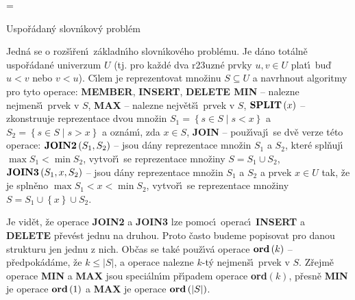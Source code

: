 



\magnification=
\NoPageNumbers
\nopagenumbers
\pagewidth{5.4in}


\def \emph#1{\underbar{#1}}
\def \Prob{\operatorname{Prob}}
\def \count{\operatorname{count}}
\def \NIL{\operatorname{NIL}}
\def \otec{\operatorname{otec}}
\def \list{\operatorname{list}}
\def \Prv{\operatorname{Prv}}
\def \Nasl{\operatorname{Nasl}}
\def \levy{\operatorname{levy}}
\def \pravy{\operatorname{pravy}}
\def \bratr{\operatorname{bratr}}
\def \Prst{\operatorname{Prst}}
\def \key{\operatorname{key}}
\def \hloubka{\operatorname{hloubka}}


\heading
Uspo\v r\'adan\'y slovn\'\i kov\'y probl\'em
\endheading

\flushpar Jedn\'a se o roz\v s\'\i\v ren\'\i\ z\'akladn\'\i ho slovn\'\i kov\'eho probl\'emu. Je 
d\'ano tot\'aln\v e uspo\v r\'adan\'e univerzum $U$ (tj. pro ka\v zd\'e dva 
r\accent23uzn\'e prvky $u,v\in U$ plat\'\i\ bu\v d $u<v$ nebo $v<
u$). C\'\i lem 
je reprezentovat 
mno\v zinu $S\subseteq U$ a navrhnout algoritmy pro tyto operace:\newline 
{\bf MEMBER}, {\bf INSERT}, {\bf DELETE\newline 
MIN} -- nalezne nejmen\v s\'\i\ prvek v $S$,\newline 
{\bf MAX} -- nalezne nejv\v et\v s\'\i\ prvek v $S$,\newline 
$\bold S\bold P\bold L\bold I\bold T\left(x\right)$ -- zkonstruuje reprezentace dvou mno\v zin 
$S_1=\left\{s\in S\mid s<x\right\}$ a $S_2=\left\{s\in S\mid s>x\right\}$ a ozn\'am\'\i , zda 
$x\in S$,\newline 
{\bf JOIN} -- pou\v z\'\i vaj\'\i\ se dv\v e verze t\'eto operace:\newline 
$\bold J\bold O\bold I\bold N\bold 2\left(S_1,S_2\right)$ -- jsou d\'any reprezentace mno\v zin $
S_1$ a $S_2$, kter\'e 
spl\v nuj\'\i\ $\max S_1<\min S_2$, vytvo\v r\'\i\ se reprezentace mno\v ziny 
$S=S_1\cup S_2$,\newline 
$\bold J\bold O\bold I\bold N\bold 3\left(S_1,x,S_2\right)$ -- jsou d\'any reprezentace mno\v zin $
S_1$ a $S_2$ a 
prvek $x\in U$ tak, \v ze je spln\v eno $\max S_1<x<\min S_2$, vytvo\v r\'\i\ 
se reprezentace mno\v ziny $S=S_1\cup \left\{x\right\}\cup S_2$.
\smallskip

\flushpar Je vid\v et, \v ze operace {\bf JOIN2} a {\bf JOIN3} lze pomoc\'\i\ ope\-rac\'\i\ 
{\bf INSERT} a {\bf DELETE} p\v rev\'est jednu na druhou. Proto \v casto budeme 
popisovat pro danou strukturu jen jednu z nich. 
Ob\v cas se tak\'e pou\v z\'\i v\'a operace\newline 
$\bold o\bold r\bold d\left(k\right)$ -- p\v redpok\'ad\'ame, \v ze $k\le |S
|$, a operace nalezne $k$-t\'y 
nejmen\v s\'\i\ prvek v $S$.\newline 
Z\v rejm\v e operace {\bf MIN} a {\bf MAX} jsou speci\'aln\'\i m p\v r\'\i padem 
ope\-race {\bf ord$\left(k\right)$}, 
p\v resn\v e {\bf MIN} je operace $\bold o\bold r\bold d\left(1\right)$ a {\bf MAX} je operace $
\bold o\bold r\bold d\left(|S|\right)$.


